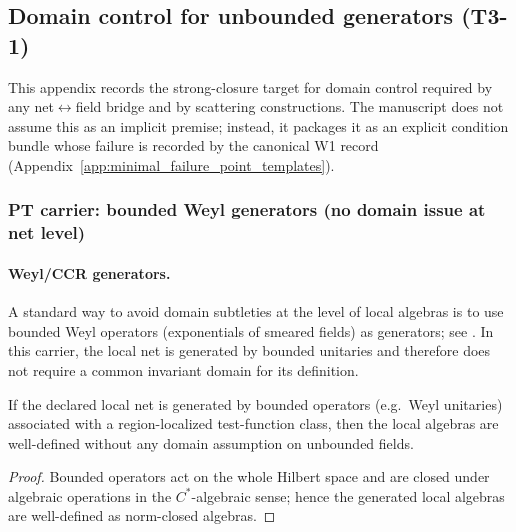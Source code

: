 \subsection{Domain control for unbounded generators (T3-1)}
\label{app:domain_control_for_generators}

\AuditTag This appendix records the strong-closure target for domain control required by any net$\leftrightarrow$field bridge and by scattering constructions.
The manuscript does not assume this as an implicit premise; instead, it packages it as an explicit condition bundle whose failure is recorded by the canonical W1 record (Appendix~\ref{app:minimal_failure_point_templates}).

\subsubsection{PT carrier: bounded Weyl generators (no domain issue at net level)}
\paragraph{Weyl/CCR generators.}
\MathTag A standard way to avoid domain subtleties at the level of local algebras is to use bounded Weyl operators (exponentials of smeared fields) as generators; see \cite{Haag1996LocalQuantumPhysics,StreaterWightman1989}.
In this carrier, the local net is generated by bounded unitaries and therefore does not require a common invariant domain for its definition.

\begin{proposition}
\label{prop:bounded_generator_net_no_domain}
\MathTag If the declared local net is generated by bounded operators (e.g.\ Weyl unitaries) associated with a region-localized test-function class, then the local algebras are well-defined without any domain assumption on unbounded fields.
\end{proposition}
\begin{proof}
Bounded operators act on the whole Hilbert space and are closed under algebraic operations in the $C^\ast$-algebraic sense; hence the generated local algebras are well-defined as norm-closed algebras.
\end{proof}


